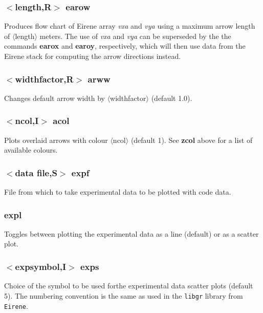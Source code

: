 \documentclass[a4paper,10pt]{report}
\begin{document}
\subsubsection{$<$length,{\bf R}$>$ earow}\label{sec:earow}\label{sec:earox}\label{sec:earoy}
Produces flow chart of Eirene array {\em vxa} and {\em vya} using a
maximum arrow length of $\langle$length$\rangle$ meters. The use of {\em vxa} and
{\em vya} can be superseded by the the commands {\bf earox} and {\bf earoy},
respectively, which will then use data from the Eirene stack for computing
the arrow directions instead.

\subsubsection{$<$widthfactor,{\bf R}$>$ arww}\label{sec:arww}
Changes default arrow width by $\langle$widthfactor$\rangle$ (default 1.0).

\subsubsection{$<$ncol,{\bf I}$>$ acol}\label{sec:acol}
Plots overlaid arrows with colour $\langle$ncol$\rangle$ (default 1).
See {\bf zcol} above for a list of available colours.

\subsubsection{$<$data file,{\bf S}$>$ expf}\label{sec:expf}
File from which to take experimental data to be plotted with code data.

\subsubsection{expl}\label{sec:expl}
Toggles between plotting the experimental data as a line (default) or as a scatter plot.

\subsubsection{$<$expsymbol,{\bf I}$>$ exps}\label{sec:exps}
Choice of the symbol to be used forthe experimental data scatter plots (default 5).
The numbering convention is the same as used in the {\tt libgr} library from {\tt Eirene}.
\end{document}
